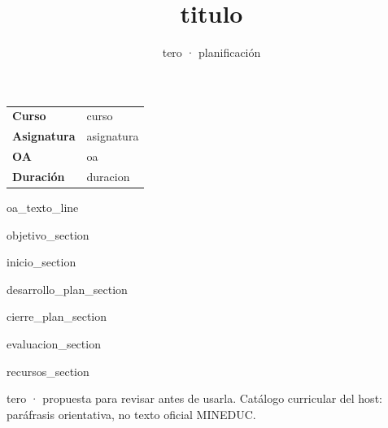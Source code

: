 \documentclass[11pt,a4paper]{article}
\title{{{titulo}}}
\author{tero · planificación}
\date{}
\begin{document}
\maketitle
\thispagestyle{fancy}

\begin{center}
\begin{tabular}{@{}ll@{}}
\toprule
\textbf{Curso} & {{curso}} \\
\textbf{Asignatura} & {{asignatura}} \\
\textbf{OA} & {{oa}} \\
\textbf{Duración} & {{duracion}} \\
\bottomrule
\end{tabular}
\end{center}

\vspace{0.5em}
{{oa_texto_line}}

{{objetivo_section}}

{{inicio_section}}

{{desarrollo_plan_section}}

{{cierre_plan_section}}

{{evaluacion_section}}

{{recursos_section}}

\vfill
{\footnotesize tero · propuesta para revisar antes de usarla. Catálogo curricular del host: paráfrasis orientativa, no texto oficial MINEDUC.}
\end{document}

